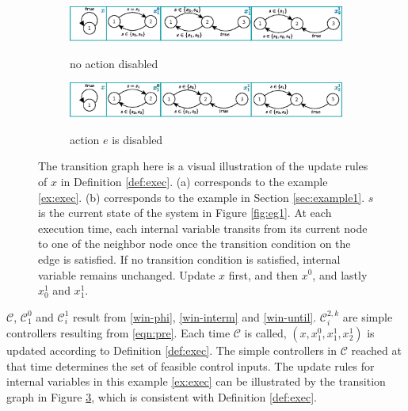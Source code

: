 \begin{example}
	\begin{figure}
		\centering
		\begin{subfigure}[b]{1\textwidth}
				\centering
				\includegraphics[width=0.7\linewidth]{pic/xupdate}
				\label{fig:xupdate1}
				\caption{no action disabled}
		\end{subfigure}
		\begin{subfigure}[b]{1\textwidth}
			\centering
			\includegraphics[width=0.7\linewidth]{pic/xupdate2}
			\label{fig:xupdate2}
			\caption{ action $ e $ is disabled}
		\end{subfigure}
		\caption{ %
			The transition graph here is a visual illustration of the update rules of $ x $ in Definition \ref{def:exec}. (a) corresponds to the example \ref{ex:exec}. (b) corresponds to the example in Section \ref{sec:example1}. $s $ is the current state of the system in Figure \ref{fig:eg1}. At each execution time, each internal variable transits from its current node to one of the neighbor node once the transition condition on the edge is satisfied. If no transition condition is satisfied, internal variable remains unchanged. Update $ x$ first, and then $ x^0 $, and lastly $ x_0^1 $ and $x^1_1 $.} 
		\label{fig:xupdate}
	\end{figure}
	
	$ \mathcal{C} $, $ \mathcal{C}_1^0 $ and $ \mathcal{C}_i^1 $ result from \eqref{win-phi}, \eqref{win-interm} and \eqref{win-until}. $ \mathcal{C}_i^{2,k} $ are simple controllers resulting from \eqref{eqn:pre}. Each time $ \mathcal{C} $ is called, $ (x,x^0_1,x^1_1,x^1_2) $ is updated according to Definition \ref{def:exec}. The simple controllers in $ \mathcal{C} $ reached at that time determines the set of feasible control inputs. The update rules for internal variables in this example \ref{ex:exec} can be illustrated by the transition graph in Figure \ref{fig:xupdate}, which is consistent with Definition \ref{def:exec}. %
	

\end{example}
